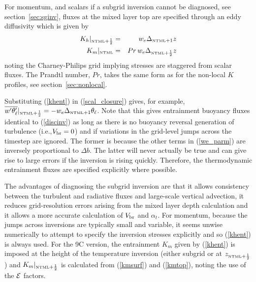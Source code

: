 \documentclass{UMDP_article}
\begin{document}
For momentum, and scalars if a subgrid inversion cannot be diagnosed,
see section~\ref{sec:sginv}, fluxes at the mixed layer top are
specified through an eddy diffusivity which is given by
\begin{eqnarray}
  K_h|_{\mbox{\tiny \rm NTML}+\frac{1}{2}} & =& w_e \Delta_{\mbox{\tiny \rm NTML}+1} z \nonumber\\
  K_m|_{\mbox{\tiny \rm NTML}}          & =& Pr \, w_e \Delta_{\mbox{\tiny \rm NTML}+\frac{1}{2}} z 
\end{eqnarray}
\label{khent}
noting the Charney-Philips grid implying stresses are staggered from
scalar fluxes.  The Prandtl number, $Pr$, takes the same form as for
the non-local $K$ profiles, see section~\ref{sec:nonlocal}.

Substituting (\ref{khent}) in (\ref{scal_closure}) gives, for example,
$\overline{w'\theta_{\ell}'}|_{\mbox{\tiny \rm NTML}+\frac{1}{2}} = - w_e \Delta_{\mbox{\tiny \rm NTML}+1} \theta_{\ell}$.  Note
that this gives entrainment buoyancy fluxes identical to
(\ref{discinv}) as long as there is no buoyancy reversal generation of
turbulence (\mbox{i.e.},$V_{\rm br}=0$) and if variations in the grid-level
jumps across the timestep are ignored.  The former is because the
other terms in (\ref{we_parm}) are inversely proportional to $\Delta
b$.  The latter will never actually be true and can give rise to large
errors if the inversion is rising quickly.  Therefore, the
thermodynamic entrainment fluxes are specified explicitly where
possible.

The advantages of diagnosing the subgrid inversion are that it allows
consistency between the turbulent and radiative fluxes and large-scale
vertical advection, it reduces grid-resolution errors arising from the
mixed layer depth calculation and it allows a more accurate
calculation of $V_{\rm br}$ and $\alpha_t$.  For momentum, because the
jumps across inversions are typically small and variable, it seems
unwise numerically to attempt to specify the inversion stresses
explicitly and so (\ref{khent}) is always used.  For the 9C
version, the entrainment $K_m$ given by (\ref{khent}) is imposed at
the height of the temperature inversion \zh (either subgrid or at
$z_{\mbox{\tiny \rm NTML}+\frac{1}{2}}$) and $K_m|_{\mbox{\tiny \rm NTML}+\frac{1}{2}}$ is calculated
from (\ref{kmsurf}) and (\ref{kmtop}), noting the use of the ${\cal
  E}$ factors.
\end{document}
